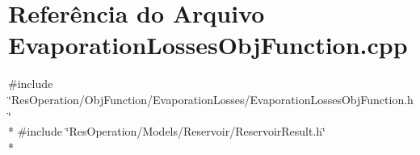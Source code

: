 \section{Referência do Arquivo Evaporation\+Losses\+Obj\+Function.\+cpp}
\label{_obj_function_2_evaporation_losses_2_evaporation_losses_obj_function_8cpp}
{\ttfamily \#include \char`\"{}Res\+Operation/\+Obj\+Function/\+Evaporation\+Losses/\+Evaporation\+Losses\+Obj\+Function.\+h\char`\"{}}\\*
{\ttfamily \#include \char`\"{}Res\+Operation/\+Models/\+Reservoir/\+Reservoir\+Result.\+h\char`\"{}}\\*
